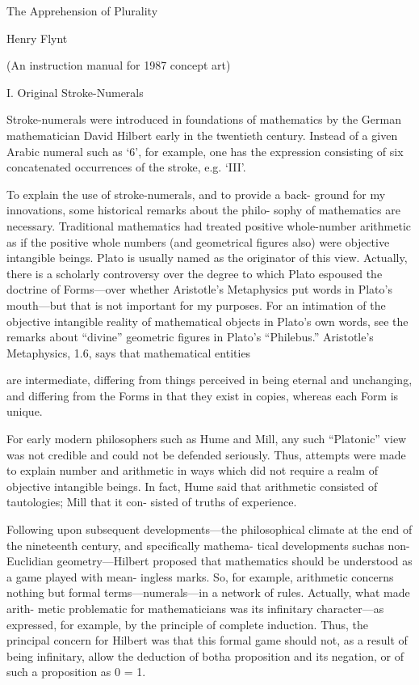 The Apprehension of Plurality 


Henry Flynt 


(An instruction manual 
for 1987 concept art) 


I. Original Stroke-Numerals 


Stroke-numerals were introduced in foundations of mathematics 
by the German mathematician David Hilbert early in the twentieth 
century. Instead of a given Arabic numeral such as ‘6’, for example, one 
has the expression consisting of six concatenated occurrences of the 
stroke, e.g. ‘III’. 

To explain the use of stroke-numerals, and to provide a back- 
ground for my innovations, some historical remarks about the philo- 
sophy of mathematics are necessary. Traditional mathematics had 
treated positive whole-number arithmetic as if the positive whole 
numbers (and geometrical figures also) were objective intangible 
beings. Plato is usually named as the originator of this view. Actually, 
there is a scholarly controversy over the degree to which Plato espoused 
the doctrine of Forms—over whether Aristotle’s Metaphysics put 
words in Plato’s mouth—but that is not important for my purposes. 
For an intimation of the objective intangible reality of mathematical 
objects in Plato’s own words, see the remarks about “divine” geometric 
figures in Plato’s “Philebus.” Aristotle’s Metaphysics, 1.6, says that 
mathematical entities 


are intermediate, differing from things perceived in being eternal and 
unchanging, and differing from the Forms in that they exist in copies, 
whereas each Form is unique. 


For early modern philosophers such as Hume and Mill, any such 
“Platonic” view was not credible and could not be defended seriously. 
Thus, attempts were made to explain number and arithmetic in ways 
which did not require a realm of objective intangible beings. In fact, 
Hume said that arithmetic consisted of tautologies; Mill that it con- 
sisted of truths of experience. 

Following upon subsequent developments—the philosophical 
climate at the end of the nineteenth century, and specifically mathema- 
tical developments suchas non-Euclidian geometry—Hilbert proposed 
that mathematics should be understood as a game played with mean- 
ingless marks. So, for example, arithmetic concerns nothing but formal 
terms—numerals—in a network of rules. Actually, what made arith- 
metic problematic for mathematicians was its infinitary character—as 
expressed, for example, by the principle of complete induction. Thus, 
the principal concern for Hilbert was that this formal game should not, 
as a result of being infinitary, allow the deduction of botha proposition 
and its negation, or of such a proposition as 0 = 1. 

